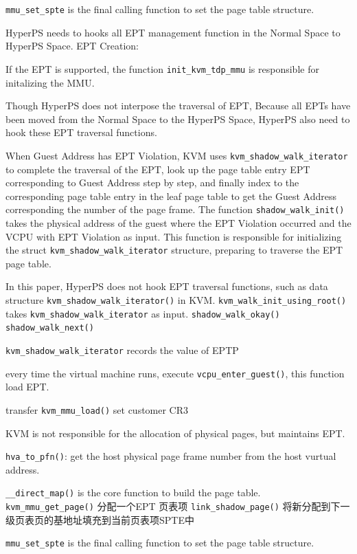 \verb|mmu_set_spte| is the final calling function to set the page table structure. 

HyperPS needs to hooks all EPT management function in the Normal Space to HyperPS Space. 
EPT Creation: 

If the EPT is supported, the function \verb|init_kvm_tdp_mmu| is responsible for initalizing the MMU. 

Though HyperPS does not interpose the traversal of EPT, Because all EPTs have been moved from the Normal Space to the HyperPS Space, HyperPS also need to hook these EPT traversal functions. 

When Guest Address has EPT Violation, KVM uses \verb|kvm_shadow_walk_iterator| to complete the traversal of the EPT, look up the page table entry EPT corresponding to Guest Address step by step, and finally index to the corresponding page table entry in the leaf page table to get the Guest Address corresponding the number of the page frame.
The function \verb|shadow_walk_init()| takes the physical address of the guest where the EPT Violation occurred and the VCPU with EPT Violation as input. 
This function is responsible for initializing the struct \verb|kvm_shadow_walk_iterator| structure, preparing to traverse the EPT page table.

In this paper, HyperPS does not hook EPT traversal functions, such as data structure \verb|kvm_shadow_walk_iterator()| in KVM. 
\verb|kvm_walk_init_using_root()| takes \verb|kvm_shadow_walk_iterator| as input. 
\verb|shadow_walk_okay()| \verb|shadow_walk_next()|

\verb|kvm_shadow_walk_iterator| records the value of EPTP

every time the virtual machine runs, execute \verb|vcpu_enter_guest()|, this function load EPT.

transfer \verb|kvm_mmu_load()| set customer CR3

KVM is not responsible for the allocation of physical pages, but maintains EPT. 

\verb|hva_to_pfn()|: get the host physical page frame number from the host vurtual address.

\verb|__direct_map()| is the core function to build the page table.
\verb|kvm_mmu_get_page()| 分配一个EPT 页表项 
\verb|link_shadow_page()| 将新分配到下一级页表页的基地址填充到当前页表项SPTE中

\verb|mmu_set_spte| is the final calling function to set the page table structure. 

